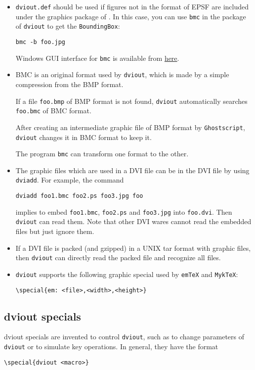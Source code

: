 \documentclass{article}
\begin{document}
\begin{itemize}
\item
{\tt dviout.def} should be used if figures not in the format of EPSF are 
included under the graphics package of {\LaTeXe}.  
In this case, you can use {\tt bmc} in the package of {\tt dviout} to get 
the {\tt BoundingBox}:
\begin{verbatim}
bmc -b foo.jpg
\end{verbatim}
Windows GUI interface for {\tt bmc} is available from 
\href{ftp://akagi.ms.u-tokyo.ac.jp/pub/TeX/dviout/utility/}{here}.

\item
BMC is an original format used by {\tt dviout}, which is made by a 
simple compression from the BMP format.  

If a file {\tt foo.bmp} of BMP format is not found, 
{\tt dviout} automatically searches {\tt foo.bmc} of BMC format.

After creating an intermediate graphic file of BMP format 
by {\tt Ghostscript}, {\tt dviout} changes it in BMC format to 
keep it.  

The program {\tt bmc} can transform one format to the other.

\item
The graphic files which are used in a DVI file can be 
in the DVI file by using {\tt dviadd}.  For example, the command
\begin{verbatim}
dviadd foo1.bmc foo2.ps foo3.jpg foo
\end{verbatim}
implies to embed {\tt foo1.bmc}, {\tt foo2.ps} and {\tt foo3.jpg}
into {\tt foo.dvi}.  Then {\tt dviout} can read them.  Note that other 
DVI wares cannot read the embedded files but just ignore them.

\item
If a DVI file is packed (and gzipped) in a UNIX tar format with 
graphic files, then {\tt dviout} can directly read the packed file and 
recognize all files.

\item
{\tt dviout} supports the following graphic special used by {\tt em\TeX} 
and {\tt Myk\TeX}:
\begin{verbatim}
\special{em: <file>,<width>,<height>}
\end{verbatim}
\end{itemize}

\subsection{dviout specials}
dviout specials are invented to control {\tt dviout}, such as to change 
parameters of {\tt dviout} or to simulate key operations.
In general, they have the format
\begin{verbatim}
\special{dviout <macro>}
\end{verbatim}
\end{document}
